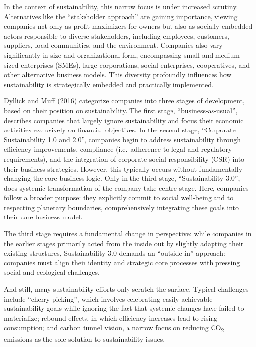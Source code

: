 \documentclass[
  a4paper,
  DIV=11,
  numbers=noendperiod,
  oneside,
  openany]{scrreprt}
\begin{document}
In the context of sustainability, this narrow focus is under increased
scrutiny. Alternatives like the ``stakeholder approach'' are gaining
importance, viewing companies not only as profit maximizers for owners
but also as socially embedded actors responsible to diverse
stakeholders, including employees, customers, suppliers, local
communities, and the environment. Companies also vary significantly in
size and organizational form, encompassing small and medium-sized
enterprises (SMEs), large corporations, social enterprises,
cooperatives, and other alternative business models. This diversity
profoundly influences how sustainability is strategically embedded and
practically implemented.

Dyllick and Muff (2016) categorize companies into three stages of
development, based on their position on sustainability. The first stage,
``business-as-usual'', describes companies that largely ignore
sustainability and focus their economic activities exclusively on
financial objectives. In the second stage, ``Corporate Sustainability
1.0 and 2.0'', companies begin to address sustainability through
efficiency improvements, compliance (i.e.~adherence to legal and
regulatory requirements), and the integration of corporate social
responsibility (CSR) into their business strategies. However, this
typically occurs without fundamentally changing the core business logic.
Only in the third stage, ``Sustainability 3.0'', does systemic
transformation of the company take centre stage. Here, companies follow
a broader purpose: they explicitly commit to social well-being and to
respecting planetary boundaries, comprehensively integrating these goals
into their core business model.

The third stage requires a fundamental change in perspective: while
companies in the earlier stages primarily acted from the inside out by
slightly adapting their existing structures, Sustainability 3.0 demands
an ``outside-in'' approach: companies must align their identity and
strategic core processes with pressing social and ecological challenges.

And still, many sustainability efforts only scratch the surface. Typical
challenges include ``cherry-picking'', which involves celebrating easily
achievable sustainability goals while ignoring the fact that systemic
changes have failed to materialize; rebound effects, in which efficiency
increases lead to rising consumption; and carbon tunnel vision, a narrow
focus on reducing CO\textsubscript{2} emissions as the sole solution to
sustainability issues.
\end{document}
